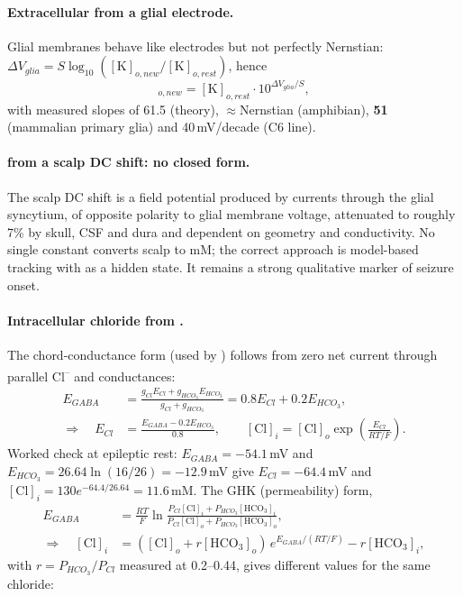 \paragraph{Extracellular \Kp{} from a glial electrode.} Glial membranes behave like \Kp{} electrodes but not perfectly Nernstian: $\Delta V_{glia} = S\log_{10}([\mathrm K]_{o,new}/[\mathrm K]_{o,rest})$, hence
\begin{equation}
[\mathrm K]_{o,new} = [\mathrm K]_{o,rest}\cdot10^{\Delta V_{glia}/S},
\end{equation}
with measured slopes of 61.5 (theory), $\approx$Nernstian (amphibian), \textbf{51} (mammalian primary glia) and 40\,mV/decade (C6 line).

\paragraph{\Kp{} from a scalp DC shift: no closed form.} The scalp DC shift is a field potential produced by currents through the glial syncytium, of opposite polarity to glial membrane voltage, attenuated to roughly 7\% by skull, CSF and dura and dependent on geometry and conductivity. No single constant converts scalp \uV{} to mM; the correct approach is model-based tracking with \Ko{} as a hidden state. It remains a strong qualitative marker of seizure onset.

\paragraph{Intracellular chloride from \EGABA.} The chord-conductance form (used by ) follows from zero net current through parallel Cl\textsuperscript{--} and \HCO{} conductances:
\begin{align}
E_{GABA} &= \frac{g_{Cl}E_{Cl}+g_{HCO_3}E_{HCO_3}}{g_{Cl}+g_{HCO_3}} = 0.8E_{Cl}+0.2E_{HCO_3},\\
\Rightarrow\quad E_{Cl} &= \frac{E_{GABA}-0.2E_{HCO_3}}{0.8},\qquad [\mathrm{Cl}]_i = [\mathrm{Cl}]_o\exp\!\left(\frac{E_{Cl}}{RT/F}\right).
\end{align}
Worked check at epileptic rest: $E_{GABA}=-54.1$\,mV and $E_{HCO_3}=26.64\ln(16/26)=-12.9$\,mV give $E_{Cl}=-64.4$\,mV and $[\mathrm{Cl}]_i = 130e^{-64.4/26.64}=11.6$\,mM. The GHK (permeability) form,
\begin{align}
E_{GABA} &= \frac{RT}{F}\ln\frac{P_{Cl}[\mathrm{Cl}]_i+P_{HCO_3}[\mathrm{HCO_3}]_i}{P_{Cl}[\mathrm{Cl}]_o+P_{HCO_3}[\mathrm{HCO_3}]_o},\\
\Rightarrow\quad [\mathrm{Cl}]_i &= ([\mathrm{Cl}]_o + r[\mathrm{HCO_3}]_o)\,e^{E_{GABA}/(RT/F)} - r[\mathrm{HCO_3}]_i,
\end{align}
with $r=P_{HCO_3}/P_{Cl}$ measured at 0.2--0.44, gives different values for the same chloride:

